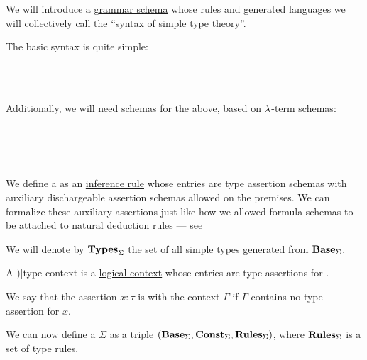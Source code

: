 \begin{definition}
\begin{thmenum}[resume=def:simple_type_system]
     We will introduce a \hyperref[def:formal_grammar/schema]{grammar schema} whose rules and generated languages we will collectively call the \enquote{\hyperref[con:syntax_semantics_duality]{syntax} of simple type theory}.

    The basic syntax is quite simple:
    \begin{bnf*}
           { \bnfsp \bnftsq{\( \synimplies \)} \bnfsp {}} \\
                 { \bnfor {}} \\
       { \bnfsp \bnftsq{\( : \)} \bnfsp {}}
    \end{bnf*}

    Additionally, we will need schemas for the above, based on \hyperref[def:lambda_term_schema]{\( \mathrm{\lambda} \)-term schemas}:
    \begin{bnf*}
            {} \\
           { \bnfsp \bnftsq{\( \synimplies \)} \bnfsp {}} \\
                 { \bnfor {} \bnfor {}} \\
       { \bnfsp \bnftsq{\( : \)} \bnfsp {}}
    \end{bnf*}

     We define a  as an \hyperref[def:inference_rule]{inference rule} whose entries are type assertion schemas with auxiliary dischargeable assertion schemas allowed on the premises. We can formalize these auxiliary assertions just like how we allowed formula schemas to be attached to natural deduction rules --- see 

     We will denote by \( \op*{Types}_\Sigma \) the set of all simple types generated from \( \op*{Base}_\Sigma \).

     A \term[en=type-context (\cite[def. 2A5]{Hindley1997STT})]{type context} is a \hyperref[def:logical_context]{logical context} whose entries are type assertions for  .

    We say that the assertion \( x: \tau \) is  with the context \( \Gamma \) if \( \Gamma \) contains no type assertion for \( x \).

     We can now define a  \( \Sigma \) as a triple \( (\op*{Base}_\Sigma, \op*{Const}_\Sigma, \op*{Rules}_\Sigma) \), where \( \op*{Rules}_\Sigma \) is a set of type rules.
  \end{thmenum}
\end{definition}

